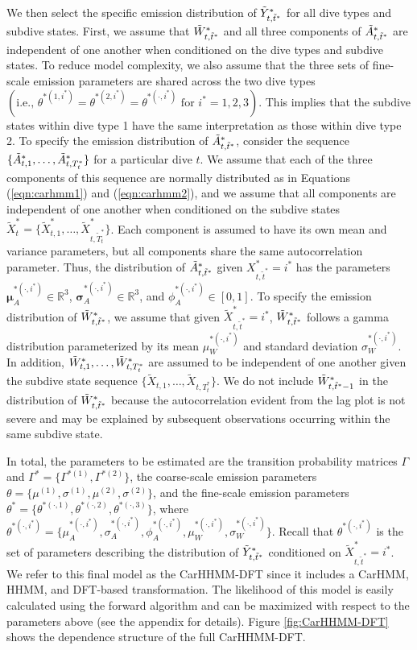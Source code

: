 We then select the specific emission distribution of $\tilde{Y}^*_{t,\tilde t^*}$ for all dive types and subdive states. First, we assume that $\tilde{W}^*_{t,\tilde t^*}$ and all three components of $\tilde{A}^*_{t,\tilde t^*}$ are independent of one another when conditioned on the dive types and subdive states. To reduce model complexity, we also assume that the three sets of fine-scale emission parameters are shared across the two dive types $\left(\text{i.e., }\theta^{*(1,i^*)} = \theta^{*(2,i^*)} = \theta^{*(\cdot,i^*)} \text{ for } i^* = 1,2,3\right)$. This implies that the subdive states within dive type 1 have the same interpretation as those within dive type 2.
To specify the emission distribution of $\tilde{A}^*_{t,\tilde t^*}$, consider the sequence $\{\tilde{A}^*_{t,1},\ldots,\tilde{A}^*_{t,T^*_t}\}$ for a particular dive $t$. We assume that each of the three components of this sequence are normally distributed as in Equations (\ref{eqn:carhmm1}) and (\ref{eqn:carhmm2}), and we assume that all components are independent of one another when conditioned on the subdive states $\tilde X^*_t = \{\tilde X^*_{t,1},\ldots,\tilde X^*_{t,\tilde T^*_t}\}$. Each component is assumed to have its own mean and variance parameters, but all components share the same autocorrelation parameter. Thus, the distribution of $\tilde{A}^*_{t,\tilde t^*}$ given $X^*_{t,\tilde t^*} = i^*$ has the parameters $\mathbf{\mu}_A^{*(\cdot,i^*)} \in \mathbb{R}^3$, $\mathbf{\sigma}_A^{*(\cdot,i^*)} \in \mathbb{R}^3$, and $\phi_A^{*(\cdot,i^*)} \in [0,1]$.
To specify the emission distribution of $\tilde{W}^*_{t,\tilde t^*}$, we assume that given $\tilde X^*_{t,\tilde t^*} = i^*$, $\tilde{W}^*_{t,\tilde t^*}$ follows a gamma distribution parameterized by its mean $\mu_W^{*(\cdot,i^*)}$ and standard deviation $\sigma_W^{*(\cdot,i^*)}$. In addition, $\tilde{W}^*_{t,1},\ldots,\tilde{W}^*_{t,T^*_t}$ are assumed to be independent of one another given the subdive state sequence $\big\{\tilde X_{t,1}, \ldots, \tilde X_{t,T_t^*}\big\}$. We do not include $\tilde{W}^*_{t,\tilde t^*-1}$ in the distribution of $\tilde{W}^*_{t,\tilde t^*}$ because the autocorrelation evident from the lag plot is not severe and may be explained by subsequent observations occurring within the same subdive state. 

In total, the parameters to be estimated are the transition probability matrices $\Gamma$ and $\Gamma^{*} = \{\Gamma^{*(1)},\Gamma^{*(2)}\}$, the coarse-scale emission parameters $\theta = \{\mu^{(1)},\sigma^{(1)},\mu^{(2)},\sigma^{(2)}\}$, and the fine-scale emission parameters $\theta^* = \{\theta^{*(\cdot,1)},\theta^{*(\cdot,2)},\theta^{*(\cdot,3)}\}$, where $\theta^{*(\cdot,i^*)} = \{\mu_A^{*(\cdot,i^*)},\sigma_A^{*(\cdot,i^*)},\phi_A^{*(\cdot,i^*)},\mu_W^{*(\cdot,i^*)},\sigma_W^{*(\cdot,i^*)}\}$. Recall that $\theta^{*(\cdot,i^*)}$ is the set of parameters describing the distribution of $\tilde{Y}^*_{t,\tilde t^*}$ conditioned on $\tilde X^*_{t,\tilde t^*} = i^*$. 
%
We refer to this final model as the CarHHMM-DFT since it includes a CarHMM, HHMM, and DFT-based transformation. The likelihood of this model is easily calculated using the forward algorithm and can be maximized with respect to the parameters above (see the appendix for details). Figure \ref{fig:CarHHMM-DFT} shows the dependence structure of the full CarHHMM-DFT.

